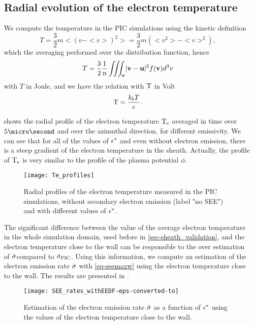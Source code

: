  \subsection{Radial evolution of the electron temperature}
 \label{subsec-Radial_Te}
 
 We compute the temperature in the \ac{PIC} simulations using the kinetic definition
 \[ T   = \frac{3}{2} m < (v - <v>)^2 > =  \frac{3}{2} m (<v^2> - <v>^2), \]
 which the averaging performed over the distribution function, hence
 \begin{equation} \label{eq-TeDef}
   T = \frac{3}{2} \frac{1}{n} \iiint_{{\mathbf v}} \lvert{\mathbf v} - {\mathbf u}\rvert^2 f({\mathbf v}) d^3v 
 \end{equation}
 with $T$ in Joule, and we have the relation with ${\rm T}$ in Volt
 \[  {\rm T} = \frac{k_b T}{e}.  \]
 
  shows the radial profile of the electron temperature $\mathrm{T_e}$ averaged in time over $5\micro\second$ and over the azimuthal direction, for different emissivity.
 We can see that for all of the values of $\epsilon^{*}$ and even without electron emission, there is a steep gradient of the electron temperature in the sheath.
 Actually, the profile of $\mathrm{T_e}$ is very similar to the profile of the plasma potential $\phi$.
 
 \begin{figure}[hbtp]
   \centering
   \texttt{[image: Te\_profiles]}
   \caption{Radial profiles of the electron temperature measured in the \ac{PIC} simulations, without secondary electron emission (label "no SEE") and with different values of $\epsilon^{*}$.  }
   \label{fig-te_profile_see}
 \end{figure}
 
 The significant difference between the value of the average electron temperature in the whole simulation domain, used before in \vref{sec-sheath_validation}, and the electron temperature close to the wall can be responsible to the over estimation of $ \bar{\sigma }$compared to $ \bar{\sigma }_{\rm PIC}$.
 Using this information, we compute an estimation of the electron emission rate $ \bar{\sigma }$ with \vref{eq-seemaxw} using the electron temperature close to the wall.
 The results are presented in .
 
 \begin{figure}[hbtp]
   \centering
   \texttt{[image: SEE\_rates\_withEEDF-eps-converted-to]}
   \caption{Estimation of the electron emission rate $ \bar{\sigma }$ as a function of $\epsilon^{*}$ using the values of the electron temperature close to the wall.}
   \label{fig-rate_pic_wall}
 \end{figure}
 
